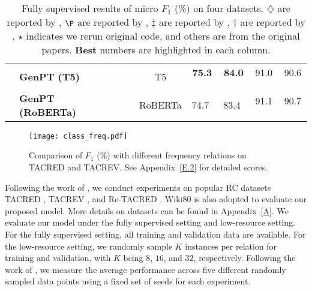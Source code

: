 \documentclass[11pt]{article}
\begin{document}
\begin{table*}[t]
{\begin{tabular}{llcccccccc}
		&	\textbf{GenPT (T5)} &\XSolidBrush&\Checkmark&\Checkmark&\small{T5}&\textbf{75.3}\textcolor{white}{$^\ddag$}&\textbf{84.0}\textcolor{white}{$^\ddag$}&91.0\textcolor{white}{$^\ddag$}&90.6\textcolor{white}{$^\ddag$}\\
		&	\textbf{GenPT (RoBERTa)} &\XSolidBrush&\Checkmark&\Checkmark&\small{RoBERTa}&74.7\textcolor{white}{$^\ddag$}&83.4\textcolor{white}{$^\ddag$}&91.1\textcolor{white}{$^\ddag$}&90.7\textcolor{white}{$^\ddag$}\\
		\bottomrule
	\end{tabular}
}
\caption{Fully supervised results of micro $F_1$ (\%) on four datasets. $\diamondsuit$ are reported by \citet{alt-etal-2020-tacred}, $\P$ are reported by \citet{DBLP:conf/aaai/StoicaPP21}, $\ddag$ are reported by \citet{DBLP:journals/corr/abs-2102-01373}, $\dag$ are reported by \citet{DBLP:journals/corr/abs-2104-07650}, $\star$ indicates we rerun original code, and others are from the original papers. \textbf{Best} numbers are highlighted in each column.}
\label{main_full}
\end{table*}
\begin{figure}[t!]
\centering
\texttt{[image: class\_freq.pdf]}
\caption{Comparison of $F_1$ (\%) with different frequency relations on TACRED and TACREV. See Appendix~\ref{E.2} for detailed scores.}
\label{class_freq} 
\end{figure}


Following the work of \citet{DBLP:journals/corr/abs-2105-11259, DBLP:journals/corr/abs-2104-07650, DBLP:journals/corr/abs-2102-01373}, we conduct experiments on popular RC datasets TACRED \cite{zhang-etal-2017-position}, TACREV \cite{alt-etal-2020-tacred}, and Re-TACRED \cite{DBLP:conf/aaai/StoicaPP21}. Wiki80 \cite{han-etal-2019-opennre} is also adopted to evaluate our proposed model. More details on datasets can be found in Appendix~\ref{A}. We evaluate our model under the fully supervised setting and low-resource setting. For the fully supervised setting, all training and validation data are available. For the low-resource setting, we randomly sample $K$ instances per relation for training and validation, with $K$ being $8$, $16$, and $32$, respectively. Following the work of \citet{gao-etal-2021-making}, we measure the average performance across five different randomly sampled data points using a fixed set of seeds for each experiment. 
\end{document}
